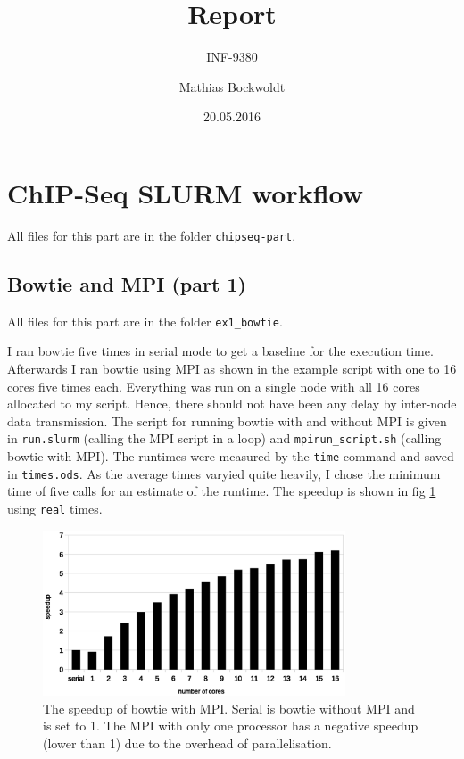 \documentclass[paper=a4, 12pt]{scrartcl}
\begin{document}
\title{Report}
\subtitle{INF-9380}
\author{Mathias Bockwoldt}
\date{20.05.2016}

\maketitle

\onehalfspacing

\section{ChIP-Seq SLURM workflow}

All files for this part are in the folder \texttt{chipseq-part}.

\subsection{Bowtie and MPI (part 1)}

All files for this part are in the folder \texttt{ex1\_bowtie}.

I ran bowtie five times in serial mode to get a baseline for the execution time. Afterwards I ran bowtie using MPI as shown in the example script with one to 16 cores five times each. Everything was run on a single node with all 16 cores allocated to my script. Hence, there should not have been any delay by inter-node data transmission. The script for running bowtie with and without MPI is given in \texttt{run.slurm} (calling the MPI script in a loop) and \texttt{mpirun\_script.sh} (calling bowtie with MPI). The runtimes were measured by the \texttt{time} command and saved in \texttt{times.ods}. As the average times varyied quite heavily, I chose the minimum time of five calls for an estimate of the runtime. The speedup is shown in fig \ref{fig:chipseq-bowtie} using \texttt{real} times.

\begin{figure}[ht]
	\centering
		\includegraphics[width=0.8\textwidth]{chipseq-bowtie}
	\caption{The speedup of bowtie with MPI. Serial is bowtie without MPI and is set to 1. The MPI with only one processor has a negative speedup (lower than 1) due to the overhead of parallelisation.}
	\label{fig:chipseq-bowtie}
\end{figure}
\end{document}
